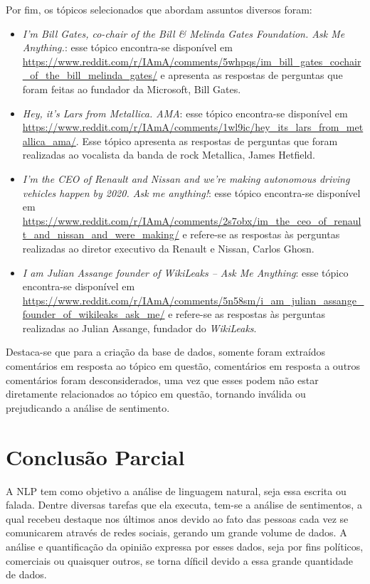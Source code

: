 Por fim, os tópicos selecionados que abordam assuntos diversos foram:
\begin{itemize}
  \item
  \textit{I’m Bill Gates, co-chair of the Bill \& Melinda Gates Foundation. Ask
  Me Anything.}: esse tópico encontra-se disponível em
  \url{https://www.reddit.com/r/IAmA/comments/5whpqs/im_bill_gates_cochair_of_the_bill_melinda_gates/}
  e apresenta as respostas de perguntas que foram feitas ao fundador
  da Microsoft, Bill Gates.
  \item
  \textit{Hey, it's Lars from Metallica. AMA}: esse tópico encontra-se disponível em
  \url{https://www.reddit.com/r/IAmA/comments/1wl9ic/hey_its_lars_from_metallica_ama/}.
  Esse tópico apresenta as respostas de perguntas que foram realizadas ao
  vocalista da banda de rock Metallica, James Hetfield.
  \item
  \textit{I'm the CEO of Renault and Nissan and we're making autonomous driving
  vehicles happen by 2020. Ask me anything!}: esse tópico encontra-se disponível em
  \url{https://www.reddit.com/r/IAmA/comments/2s7obx/im_the_ceo_of_renault_and_nissan_and_were_making/}
  e refere-se as respostas às perguntas realizadas ao diretor executivo da Renault e Nissan,
  Carlos Ghosn.
  
  \item
  \textit{I am Julian Assange founder of WikiLeaks -- Ask Me Anything}: esse
  tópico encontra-se disponível em
  \url{https://www.reddit.com/r/IAmA/comments/5n58sm/i_am_julian_assange_founder_of_wikileaks_ask_me/}
  e refere-se as respostas às perguntas realizadas ao Julian Assange, fundador do
  \textit{WikiLeaks}.
  
\end{itemize}


Destaca-se que para a criação da base de dados, somente foram extraídos
comentários em resposta ao tópico em questão, comentários em resposta a outros
comentários foram desconsiderados, uma vez que esses podem não estar diretamente
relacionados ao tópico em questão, tornando inválida ou prejudicando a análise de sentimento.


\chapter{Conclusão Parcial}
\label{cap:conclusao}
A \ac{NLP} tem como objetivo a análise de linguagem natural, seja
essa escrita ou falada. Dentre diversas tarefas que ela executa, tem-se a
análise de sentimentos, a qual recebeu destaque nos últimos anos devido ao fato das pessoas cada vez se comunicarem através de redes sociais,
gerando um grande volume de dados. A análise e quantificação da opinião expressa por esses dados, seja
por fins políticos, comerciais ou quaisquer outros, se torna díficil devido a
essa grande quantidade de dados.

